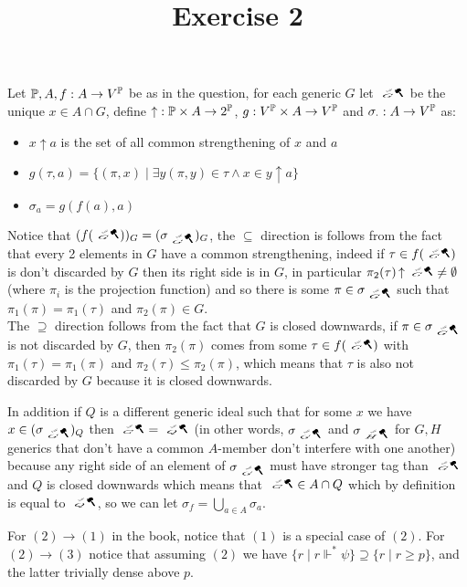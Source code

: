 


\title{Exercise 2}

\maketitle
\ex{}
Let $\Bbb P, A, f:A\to V^\Bbb P$ be as in the question, for each generic $G$ let $\bonk{G}$ be the unique $x\in A\cap G$, define $\operatorname{\uparrow}:\Bbb P\times A\to 2^\Bbb P$, $g:V^\Bbb P\times A\to V^\Bbb P$ and $\sigma_\cdot:A\to V^\P$ as:

\begin{itemize}
	\item $x\operatorname{\uparrow}a$ is the set of all common strengthening of $x$ and $a$
	\item $g(\tau, a)=\{(\pi, x)\mid\exists y (\pi, y)\in \tau\land x\in y\operatorname{\uparrow}a\}$
	\item $\sigma_a=g(f(a),a)$
\end{itemize}

Notice that $(f(\bonk{G}))_G=(\sigma_{\bonk{G}})_G$, the $\subseteq$ direction is follows from the fact that every 2 elements in $G$ have a common strengthening, indeed if $\tau\in f(\bonk{G})$ is don't discarded by $G$ then its right side is in $G$, in particular $\pi_2(\tau)\operatorname{\uparrow}\bonk{G}\ne \emptyset$ (where $\pi_i$ is the projection function) and so there is some $\pi\in \sigma_{\bonk{G}}$ such that $\pi_1(\pi)=\pi_1(\tau)$ and $\pi_2(\pi)\in G$.\\
The $\supseteq$ direction follows from the fact that $G$ is closed downwards, if $\pi\in \sigma_{\bonk{G}}$ is not discarded by $G$, then $\pi_2(\pi)$ comes from some $\tau\in f(\bonk{G})$ with $\pi_1(\tau)=\pi_1(\pi)$ and $\pi_2(\tau)\le\pi_2(\pi)$, which means that $\tau$ is also not discarded by $G$ because it is closed downwards.

In addition if $Q$ is a different generic ideal such that for some $x$ we have $x\in (\sigma_{\bonk{G}})_Q$ then $\bonk{G}=\bonk{Q}$ (in other words, $\sigma_{\bonk{G}}$ and $\sigma_{\bonk{H}}$ for $G,H$ generics that don't have a common $A$-member don't interfere with one another) because any right side  of an element of $\sigma_{\bonk{G}}$ must have stronger tag than $\bonk{G}$ and $Q$ is closed downwards which means that $\bonk{G}\in A\cap Q$ which by definition is equal to $\bonk{Q}$, so we can let $\sigma_f=\bigcup_{a\in A}\sigma_a$.

\ex[4]{}
\sub{}
For $(2)\to (1)$ in the book, notice that $(1)$ is a special case of $(2)$.
For $(2)\to (3)$ notice that assuming $(2)$ we have $\{r\mid r\Vdash^* \psi\}\supseteq \{r\mid r\ge p\}$, and the latter trivially dense above $p$.


